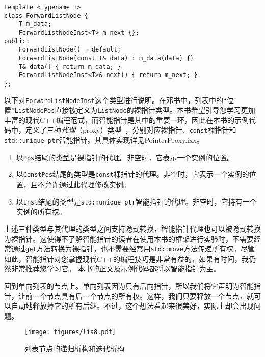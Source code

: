 \begin{lstlisting}
template <typename T>
class ForwardListNode {
    T m_data;
    ForwardListNodeInst<T> m_next {};
public:
    ForwardListNode() = default;
    ForwardListNode(const T& data) : m_data(data) {}
    T& data() { return m_data; }
    ForwardListNodeInst<T>& next() { return m_next; }
};
\end{lstlisting}

以下对\lstinline{ForwardListNodeInst}这个类型进行说明。在邓书中，列表中的“位置”\lstinline{ListNodePos}直接被定义为\lstinline{ListNode}的裸指针类型。本书希望引导您学习更加丰富的现代C++编程范式，而智能指针是其中的重要一环，因此在本书的示例代码中，定义了三种\textit{代理}（proxy）类型~\cite{gregoire2021professional}，分别对应裸指针、\lstinline{const}裸指针和\lstinline{std::unique_ptr}智能指针。其具体实现详见PointerProxy.ixx。
\begin{enumerate}
    \item 以\lstinline{Pos}结尾的类型是裸指针的代理。非空时，它表示一个实例的位置。
    \item 以\lstinline{ConstPos}结尾的类型是\lstinline{const}裸指针的代理。非空时，它表示一个实例的位置，且不允许通过此代理修改实例。
    \item 以\lstinline{Inst}结尾的类型是\lstinline{std::unique_ptr}智能指针的代理。非空时，它持有一个实例的所有权。
\end{enumerate}

上述三种类型与其代理的类型之间支持隐式转换，智能指针代理也可以被隐式转换为裸指针。这使得不了解智能指针的读者在使用本书的框架进行实验时，不需要经常通过\lstinline{get}方法转换为裸指针，也不需要经常用\lstinline{std::move}方法传递所有权。尽管如此，智能指针对您掌握现代C++的编程技巧是非常有益的，如果有时间，我仍然非常推荐您学习它。
本书的正文及示例代码都将以智能指针为主。


回到单向列表的节点上。单向列表因为只有后向指针，所以我们将它声明为智能指针，让前一个节点具有后一个节点的所有权。这样，我们只要释放一个节点，就可以自动地释放掉它的所有后继。不过，这个想法看起来很美好，实际上却会出现问题。

\begin{figure}
  \centering
  \texttt{[image: figures/lis8.pdf]}
  \caption{列表节点的递归析构和迭代析构}
  \label{fig:lis8}
\end{figure}


